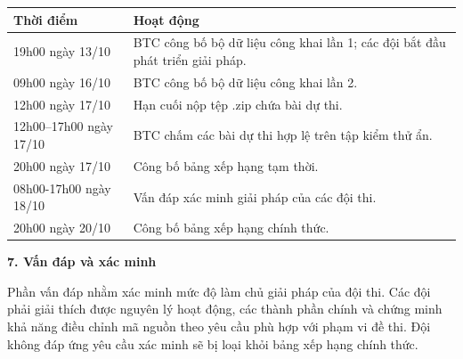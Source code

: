 \documentclass[12pt,a4paper]{article}
\begin{document}
\vspace{2pt}
\noindent
{
\begin{tabularx}{\textwidth}{p{4.0cm} X}
\rowcolor{headergray}
\textbf{Thời điểm} & \textbf{Hoạt động} \\
\hline
19h00 ngày 13/10 & BTC công bố bộ dữ liệu công khai lần 1; các đội bắt đầu phát triển giải pháp. \\
\hline
09h00 ngày 16/10 & BTC công bố bộ dữ liệu công khai lần 2. \\
\hline
12h00 ngày 17/10 & Hạn cuối nộp tệp .zip chứa bài dự thi. \\
\hline
12h00--17h00 ngày 17/10 & BTC chấm các bài dự thi hợp lệ trên tập kiểm thử ẩn. \\
\hline
20h00 ngày 17/10 & Công bố bảng xếp hạng tạm thời. \\
\hline
08h00-17h00 ngày 18/10 & Vấn đáp xác minh giải pháp của các đội thi. \\
\hline
20h00 ngày 20/10 & Công bố bảng xếp hạng chính thức. \\
\hline
\end{tabularx}
}
\vspace{8pt}

\textbf{7. Vấn đáp và xác minh}

Phần vấn đáp nhằm xác minh mức độ làm chủ giải pháp của đội thi. Các đội phải giải thích được nguyên lý hoạt động, các thành phần chính và chứng minh khả năng điều chỉnh mã nguồn theo yêu cầu phù hợp với phạm vi đề thi. Đội không đáp ứng yêu cầu xác minh sẽ bị loại khỏi bảng xếp hạng chính thức.
\end{document}
